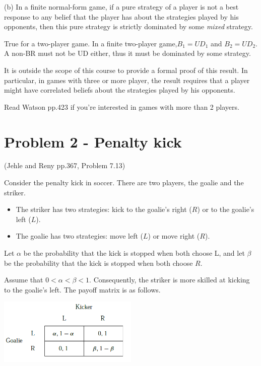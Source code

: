\documentclass{article}
\begin{document}
%
(b) In a finite normal-form game, if a pure strategy of a
player is not a best response to any belief that the player has about the strategies played by his opponents, then this pure strategy is strictly dominated by some \textit{mixed} strategy.

\medskip

True for a two-player game. In a finite two-player game,$B_1 = UD_1$ and $B_2 = UD_2$. A non-BR must not be UD either, thus it must be dominated by some strategy.


\begin{mdframed}[backgroundcolor=blue!20,linecolor=white]
It is outside the scope of this course to provide a formal proof of this result. In particular, in games with three or more player, the result requires that a player might have correlated beliefs about the strategies played by his opponents.

\smallskip

Read Watson pp.423 if you're interested in games with more than 2 players.
\end{mdframed}

\newpage
\section{Problem 2 - Penalty kick} 

(Jehle and Reny pp.367, Problem 7.13)

Consider the penalty kick in soccer. There are two players, the goalie and the striker. 
\begin{itemize}
\item The striker has two strategies: kick to the goalie's right ($R$) or to the goalie's left ($L$). 
\item The goalie has two strategies: move left ($L$) or move right ($R$). 
\end{itemize}

Let $\alpha$ be the probability that the kick is stopped when both choose
L, and let $\beta$ be the probability that the kick is stopped when both choose $R$. 

Assume that $0 < \alpha < \beta < 1$. Consequently, the striker is more skilled at kicking to the goalie's left. The payoff matrix is as follows.

\begin{center}
{\includegraphics[width=0.5\textwidth]{8.q7_13}
\label{fig:q7_13}
\vspace{2mm}}
\end{center}
\end{document}
